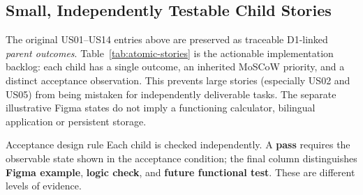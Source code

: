 \documentclass[12pt,a4paper]{article}
\begin{document}



\subsection{Small, Independently Testable Child Stories}
The original US01--US14 entries above are preserved as traceable D1-linked \emph{parent outcomes}. Table~\ref{tab:atomic-stories} is the actionable implementation backlog: each child has a single outcome, an inherited MoSCoW priority, and a distinct acceptance observation. This prevents large stories (especially US02 and US05) from being mistaken for independently deliverable tasks. The separate illustrative Figma states do not imply a functioning calculator, bilingual application or persistent storage.

\begin{chapterfocus}{Acceptance design rule}
Each child is checked independently. A \textbf{pass} requires the observable state shown in the acceptance condition; the final column distinguishes \textbf{Figma example}, \textbf{logic check}, and \textbf{future functional test}. These are different levels of evidence.
\end{chapterfocus}
\end{document}
